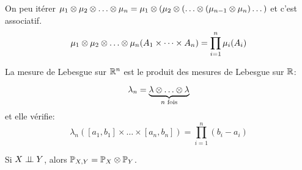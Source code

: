 \begin{remarque}
	On peu itérer $\mu_1 \xor \mu_2 \xor \dots \xor \mu_n = \mu_1 \xor (\mu_2 \xor (\dots \xor (\mu_{n-1} \xor \mu_n)\dots)$ et c'est associatif.
	$$ \mu_1 \xor \mu_2 \xor \dots \xor \mu_n(A_1 \times \dots \times A_n) = \prod_{i=1}^n \mu_i(A_i) $$
\end{remarque}


\begin{example}
	La mesure de Lebesgue sur $\mathbb{R}^n$ est le produit des mesures de Lebesgue sur $\mathbb{R}$:

	$$\lambda_n = \underbrace{\lambda \xor \dots \xor \lambda}_{n \text{ fois}}$$
	et elle vérifie:
	$$\lambda_n([a_1, b_1] \times \dots \times [a_n, b_n]) = \prod_{i=1}^n (b_i - a_i)$$
\end{example}

\begin{remarque}
	Si $X \perp\!\!\! \perp Y$, alors $\mathbb{P}_{X,Y} = \mathbb{P}_X \otimes \mathbb{P}_Y$.
\end{remarque}
